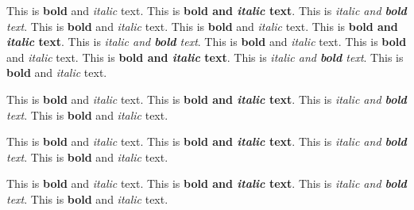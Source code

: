This is \textbf{bold} and \emph{italic} text.
This is \textbf{bold and \emph{italic} text}.
This is \emph{italic and \textbf{bold} text}.
This is \textbf{bold} and \emph{italic} text.
This is \textbf{bold} and \emph{italic} text.
This is \textbf{bold and \emph{italic} text}.
This is \emph{italic and \textbf{bold} text}.
This is \textbf{bold} and \emph{italic} text.
This is \textbf{bold} and \emph{italic} text.
This is \textbf{bold and \emph{italic} text}.
This is \emph{italic and \textbf{bold} text}.
This is \textbf{bold} and \emph{italic} text.
\begin{frame}[t]
This is \textbf{bold} and \emph{italic} text.
This is \textbf{bold and \emph{italic} text}.
This is \emph{italic and \textbf{bold} text}.
This is \textbf{bold} and \emph{italic} text.
\end{frame}

\begin{frame}[t]
This is \textbf{bold} and \emph{italic} text.
This is \textbf{bold and \emph{italic} text}.
This is \emph{italic and \textbf{bold} text}.
This is \textbf{bold} and \emph{italic} text.
\end{frame}

\begin{frame}[t]
This is \textbf{bold} and \emph{italic} text.
This is \textbf{bold and \emph{italic} text}.
This is \emph{italic and \textbf{bold} text}.
This is \textbf{bold} and \emph{italic} text.
\end{frame}

